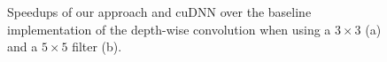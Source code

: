\begin{figure}
\centering
	

\vspace{-2mm} \caption{Speedups of our approach and cuDNN over the baseline implementation of the depth-wise convolution when using a
$3\times 3$ (a) and a $5\times 5$ filter (b).} \label{fig:3druntime}
\vspace{-2mm}
\end{figure}


